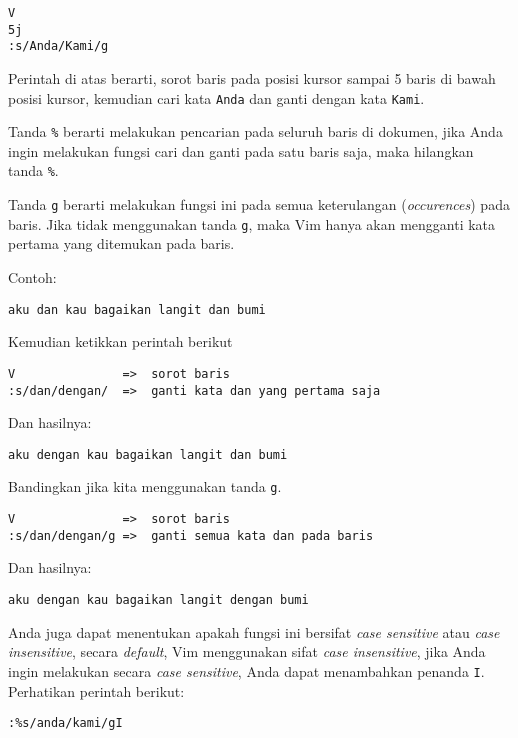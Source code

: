 \documentclass{article}
\begin{document}
\begin{verbatim}
V
5j
:s/Anda/Kami/g
\end{verbatim}

Perintah di atas berarti, sorot baris pada posisi kursor
sampai 5 baris di bawah posisi kursor, kemudian cari kata
\verb=Anda= dan ganti dengan kata \verb=Kami=.

Tanda \verb=%= berarti melakukan pencarian pada seluruh
baris di dokumen, jika Anda ingin melakukan fungsi cari dan
ganti pada satu baris saja, maka hilangkan tanda \verb=%=.

Tanda \verb=g= berarti melakukan fungsi ini pada semua
keterulangan (\emph{occurences}) pada baris. Jika tidak
menggunakan tanda \verb=g=, maka Vim hanya akan mengganti
kata pertama yang ditemukan pada baris.

Contoh:

\begin{verbatim}
aku dan kau bagaikan langit dan bumi
\end{verbatim}

Kemudian ketikkan perintah berikut

\begin{verbatim}
V               =>  sorot baris
:s/dan/dengan/  =>  ganti kata dan yang pertama saja
\end{verbatim}

Dan hasilnya:

\begin{verbatim}
aku dengan kau bagaikan langit dan bumi
\end{verbatim}

Bandingkan jika kita menggunakan tanda \verb=g=.

\begin{verbatim}
V               =>  sorot baris
:s/dan/dengan/g =>  ganti semua kata dan pada baris
\end{verbatim}

Dan hasilnya:

\begin{verbatim}
aku dengan kau bagaikan langit dengan bumi
\end{verbatim}

Anda juga dapat menentukan apakah fungsi ini bersifat
\emph{case sensitive} atau \emph{case insensitive}, secara
\emph{default}, Vim menggunakan sifat \emph{case
insensitive}, jika Anda ingin melakukan secara \emph{case
sensitive}, Anda dapat menambahkan penanda \verb=I=.
Perhatikan perintah berikut:

\begin{verbatim}
:%s/anda/kami/gI
\end{verbatim}
\end{document}
